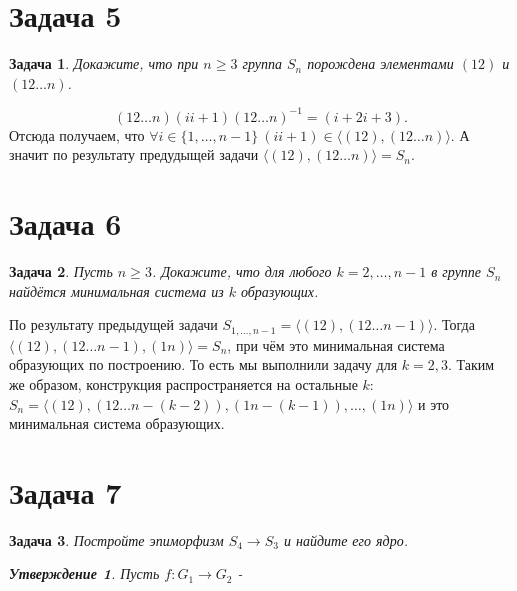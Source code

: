 \documentclass{article}
\newtheorem{task}{Задача}
\newtheorem{statement}{Утверждение}
\newcommand{\gen}[1]{\langle #1 \rangle}
\newcommand{\srange}[2]{\{#1, \dots, #2\}}
\newcommand{\range}[2]{#1, \dots, #2}
\newcommand{\ad}[2]{#1#2#1^{-1}}
\begin{document}
\section*{Задача 5}

\begin{task}
Докажите, что при $n \geq 3$ группа $S_n$ порождена элементами $(12)$ и $(12 \dots n)$.
\end{task}

\begin{equation*}
    \ad{(12 \dots n)}{(ii+1)} = (i+2 i+3).
\end{equation*}
Отсюда получаем, что $\forall i \in \srange{1}{n - 1} ~ (i i+1) \in \gen{(12), (12 \dots n)}$.
А значит по результату предудыщей задачи $\gen{(12), (12 \dots n)} = S_n$.

\section*{Задача 6}

\begin{task}
Пусть $n \geq 3$. Докажите, что для любого $k = \range{2}{n - 1}$ в группе $S_n$ 
найдётся минимальная система из $k$ образующих.  
\end{task}

По результату предыдущей задачи $S_{\range{1}{n - 1}} = \gen{(12), (12 \dots n - 1)}$.
Тогда $\gen{(12), (12 \dots n - 1), (1n)} = S_n$, 
при чём это минимальная система образующих по построению. То есть мы выполнили задачу для $k = 2, 3$.
Таким же образом, конструкция распространяется на остальные $k$:
$S_n = \gen{(12), (12 \dots n - (k - 2)), (1 n - (k - 1)), \dots, (1 n)}$ 
и это минимальная система образующих.

\section*{Задача 7}
\begin{task}
Постройте эпиморфизм $S_4 \to S_3$ и найдите его ядро.

\begin{statement}
Пусть $f: G_1 \to G_2$ - 
\end{statement}
\end{task}
\end{document}
